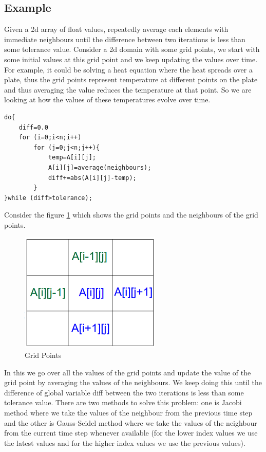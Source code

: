\documentclass[12pt]{book}
\begin{document}
\subsection{Example}
Given a 2d array of float values, repeatedly average each elements with immediate neighbours until the difference between two
iterations is less than some tolerance value. Consider a 2d domain with some grid points, we start with some initial values at this grid point and we keep updating the values over time.
For example, it could be solving a heat equation where the heat spreads over a plate, thus the grid points represent temperature at different points on the plate and thus averaging the value reduces the temperature at that point.
So we are looking at how the values of these temperatures evolve over time.

\begin{lstlisting}[caption={Parallel Program for Averaging},captionpos=b]
do{
    diff=0.0
    for (i=0;i<n;i++)
        for (j=0;j<n;j++){
            temp=A[i][j];
            A[i][j]=average(neighbours);
            diff+=abs(A[i][j]-temp);
        }
}while (diff>tolerance);    
\end{lstlisting}
Consider the figure \ref{fig:grid} which shows the grid points and the neighbours of the grid points.
\begin{figure}[H]
    \centering
    \includegraphics[width=0.6\textwidth]{images/grid.png}
    \caption{Grid Points}
    \label{fig:grid}
\end{figure}
In this we go over all the values of the grid points and update the value of the grid point by averaging the values of the neighbours. We keep doing this until the difference of global variable diff between the two iterations is less than some tolerance value.
There are two methods to solve this problem: one is Jacobi method where we take the values of the neighbour from the previous time step and the other is Gauss-Seidel method where we take the values of the neighbour from the current time step whenever available (for the lower index values we use the latest values and for the higher index values we use the previous values).
\end{document}
